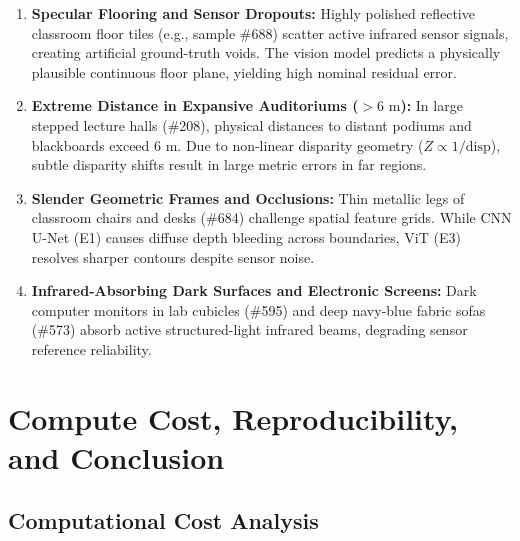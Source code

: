 \documentclass[twoside,final]{hcmut-report}
\begin{document}
\begin{enumerate}

  \item \textbf{Specular Flooring and Sensor Dropouts:} Highly polished reflective classroom floor tiles (e.g., sample \#688) scatter active infrared sensor signals, creating artificial ground-truth voids. The vision model predicts a physically plausible continuous floor plane, yielding high nominal residual error.

  \item \textbf{Extreme Distance in Expansive Auditoriums ($>6\text{ m}$):} In large stepped lecture halls (\#208), physical distances to distant podiums and blackboards exceed $6\text{ m}$. Due to non-linear disparity geometry ($Z \propto 1/\text{disp}$), subtle disparity shifts result in large metric errors in far regions.

  \item \textbf{Slender Geometric Frames and Occlusions:} Thin metallic legs of classroom chairs and desks (\#684) challenge spatial feature grids. While CNN U-Net (E1) causes diffuse depth bleeding across boundaries, ViT (E3) resolves sharper contours despite sensor noise.

  \item \textbf{Infrared-Absorbing Dark Surfaces and Electronic Screens:} Dark computer monitors in lab cubicles (\#595) and deep navy-blue fabric sofas (\#573) absorb active structured-light infrared beams, degrading sensor reference reliability.

\end{enumerate}




\FloatBarrier

\section{Compute Cost, Reproducibility, and Conclusion}

\label{sec:conclusion}

\subsection{Computational Cost Analysis}
\end{document}
